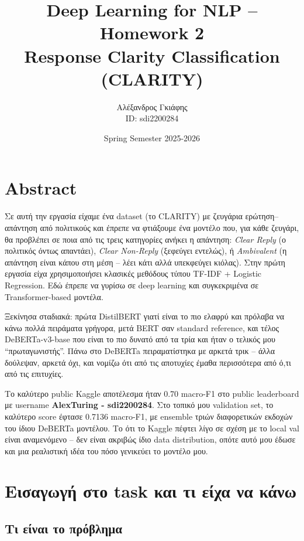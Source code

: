 \documentclass[12pt]{fphw}
\title{Deep Learning for NLP -- Homework 2 \\ Response Clarity Classification (CLARITY)}
\author{Αλέξανδρος Γκιάφης \\ ID: sdi2200284}
\date{Spring Semester 2025-2026}
\institute{National and Kapodistrian University of Athens \\ Department of Informatics and Telecommunications}
\begin{document}
\maketitle

{
  \hypersetup{linkcolor=black}
  \tableofcontents
}
\newpage

\section{Abstract}

Σε αυτή την εργασία είχαμε ένα dataset (το CLARITY) με ζευγάρια ερώτηση--απάντηση από πολιτικούς και έπρεπε να φτιάξουμε ένα μοντέλο που, για κάθε ζευγάρι, θα προβλέπει σε ποια από τις τρεις κατηγορίες ανήκει η απάντηση: \emph{Clear Reply} (ο πολιτικός όντως απαντάει), \emph{Clear Non-Reply} (ξεφεύγει εντελώς), ή \emph{Ambivalent} (η απάντηση είναι κάπου στη μέση -- λέει κάτι αλλά υπεκφεύγει κιόλας). Στην πρώτη εργασία είχα χρησιμοποιήσει κλασικές μεθόδους τύπου TF-IDF + Logistic Regression. Εδώ έπρεπε να γυρίσω σε deep learning και συγκεκριμένα σε Transformer-based μοντέλα.

Ξεκίνησα σταδιακά: πρώτα DistilBERT \cite{sanh2019distilbert} γιατί είναι το πιο ελαφρύ και πρόλαβα να κάνω πολλά πειράματα γρήγορα, μετά BERT \cite{devlin2019bert} σαν standard reference, και τέλος DeBERTa-v3-base \cite{he2021deberta} που είναι το πιο δυνατό από τα τρία και ήταν ο τελικός μου ``πρωταγωνιστής''. Πάνω στο DeBERTa πειραματίστηκα με αρκετά τρικ -- άλλα δούλεψαν, αρκετά όχι, και νομίζω ότι από τις αποτυχίες έμαθα περισσότερα από ό,τι από τις επιτυχίες.

Το καλύτερο public Kaggle αποτέλεσμα ήταν 0.70 macro-F1 στο public leaderboard με username \textbf{AlexTuring - sdi2200284}. Στο τοπικό μου validation set, το καλύτερο score έφτασε 0.7136 macro-F1, με ensemble τριών διαφορετικών εκδοχών του ίδιου DeBERTa μοντέλου. Το ότι το Kaggle πέφτει λίγο σε σχέση με το local val είναι αναμενόμενο -- δεν είναι ακριβώς ίδιο data distribution, οπότε αυτό μου έδωσε και μια ρεαλιστική ιδέα του πόσο γενικεύει το μοντέλο μου.

\section{Εισαγωγή στο task και τι είχα να κάνω}

\subsection{Τι είναι το πρόβλημα}
\end{document}
